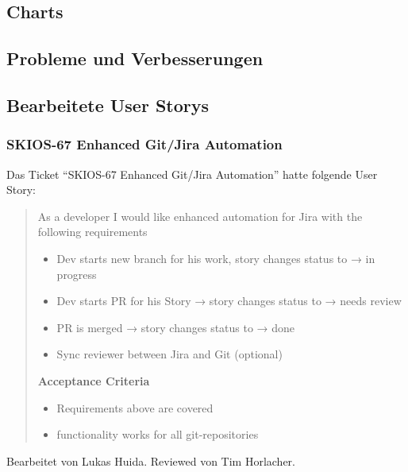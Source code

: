\subsection{Charts}
\subsection{Probleme und Verbesserungen}

\subsection{Bearbeitete User Storys}

\subsubsection{SKIOS-67 Enhanced Git/Jira Automation}
Das Ticket \enquote{SKIOS-67 Enhanced Git/Jira Automation} hatte folgende User Story:
\begin{quotation}
    As a developer I would like enhanced automation for Jira with the following requirements
    \begin{itemize}
        \item Dev starts new branch for his work, story changes status to → in progress
        \item Dev starts PR for his Story → story changes status to → needs review
        \item PR is merged → story changes status to → done
        \item Sync reviewer between Jira and Git (optional) 
    \end{itemize}

    \textbf{Acceptance Criteria}
    \begin{itemize}
        \item Requirements above are covered
        \item functionality works for all git-repositories
    \end{itemize}
\end{quotation}
Bearbeitet von Lukas Huida.
Reviewed von Tim Horlacher.


